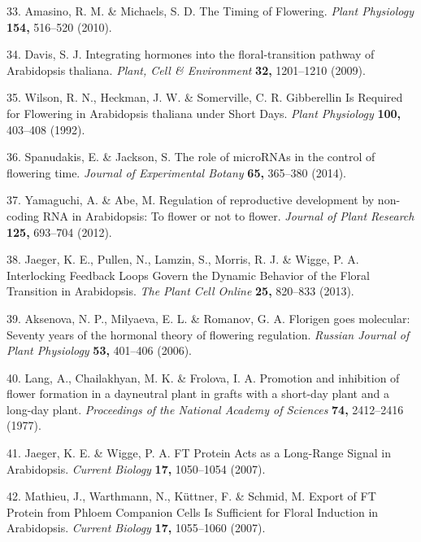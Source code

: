 \documentclass[12pt,]{book}
\begin{document}
\hypertarget{ref-amasino_timing_2010}{}
33. Amasino, R. M. \& Michaels, S. D. The Timing of Flowering.
\emph{Plant Physiology} \textbf{154,} 516--520 (2010).

\hypertarget{ref-davis_integrating_2009}{}
34. Davis, S. J. Integrating hormones into the floral-transition pathway
of Arabidopsis thaliana. \emph{Plant, Cell \& Environment} \textbf{32,}
1201--1210 (2009).

\hypertarget{ref-wilson_gibberellin_1992}{}
35. Wilson, R. N., Heckman, J. W. \& Somerville, C. R. Gibberellin Is
Required for Flowering in Arabidopsis thaliana under Short Days.
\emph{Plant Physiology} \textbf{100,} 403--408 (1992).

\hypertarget{ref-spanudakis_role_2014}{}
36. Spanudakis, E. \& Jackson, S. The role of microRNAs in the control
of flowering time. \emph{Journal of Experimental Botany} \textbf{65,}
365--380 (2014).

\hypertarget{ref-yamaguchi_regulation_2012}{}
37. Yamaguchi, A. \& Abe, M. Regulation of reproductive development by
non-coding RNA in Arabidopsis: To flower or not to flower. \emph{Journal
of Plant Research} \textbf{125,} 693--704 (2012).

\hypertarget{ref-jaeger_interlocking_2013}{}
38. Jaeger, K. E., Pullen, N., Lamzin, S., Morris, R. J. \& Wigge, P. A.
Interlocking Feedback Loops Govern the Dynamic Behavior of the Floral
Transition in Arabidopsis. \emph{The Plant Cell Online} \textbf{25,}
820--833 (2013).

\hypertarget{ref-aksenova_florigen_2006}{}
39. Aksenova, N. P., Milyaeva, E. L. \& Romanov, G. A. Florigen goes
molecular: Seventy years of the hormonal theory of flowering regulation.
\emph{Russian Journal of Plant Physiology} \textbf{53,} 401--406 (2006).

\hypertarget{ref-lang_promotion_1977}{}
40. Lang, A., Chailakhyan, M. K. \& Frolova, I. A. Promotion and
inhibition of flower formation in a dayneutral plant in grafts with a
short-day plant and a long-day plant. \emph{Proceedings of the National
Academy of Sciences} \textbf{74,} 2412--2416 (1977).

\hypertarget{ref-jaeger_ft_2007}{}
41. Jaeger, K. E. \& Wigge, P. A. FT Protein Acts as a Long-Range Signal
in Arabidopsis. \emph{Current Biology} \textbf{17,} 1050--1054 (2007).

\hypertarget{ref-mathieu_export_2007}{}
42. Mathieu, J., Warthmann, N., Küttner, F. \& Schmid, M. Export of FT
Protein from Phloem Companion Cells Is Sufficient for Floral Induction
in Arabidopsis. \emph{Current Biology} \textbf{17,} 1055--1060 (2007).
\end{document}
